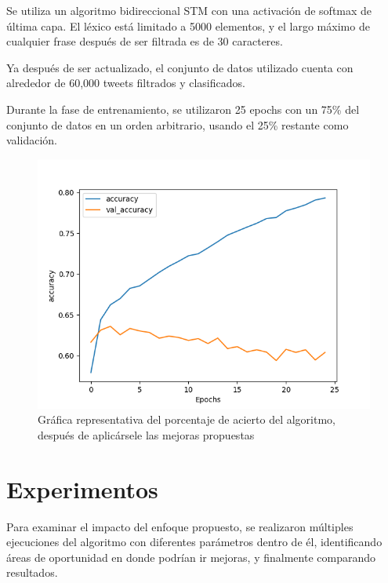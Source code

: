 \documentclass[a4]{sciposter}
\begin{document}
\begin{multicols}{3}
Se utiliza un algoritmo bidireccional STM con una activación de softmax de última capa. El léxico está limitado a 5000 elementos, y el largo máximo de cualquier frase después de ser filtrada es de 30 caracteres.

Ya después de ser actualizado, el conjunto de datos utilizado cuenta con alrededor de 60,000 tweets filtrados y clasificados.

Durante la fase de entrenamiento, se utilizaron 25 epochs con un 75\% del conjunto de datos en un orden arbitrario, usando el 25\% restante como validación.

\begin{figure}
	\centering
	\captionsetup{type=figure}
	\setcounter{figure}{1}
	\includegraphics[scale=1.3]{img/Accuracy 2021-07.png}
	\caption{Gráfica representativa del porcentaje de acierto del algoritmo, después de aplicársele las mejoras propuestas}	
\end{figure}

\section{Experimentos}
Para examinar el impacto del enfoque propuesto, se realizaron múltiples ejecuciones del algoritmo con diferentes parámetros dentro de él, identificando áreas de oportunidad en donde podrían ir mejoras, y finalmente comparando resultados.



\begin{figure}[!tbp]
\captionsetup{type=figure}



\end{figure}
\end{multicols}
\end{document}
